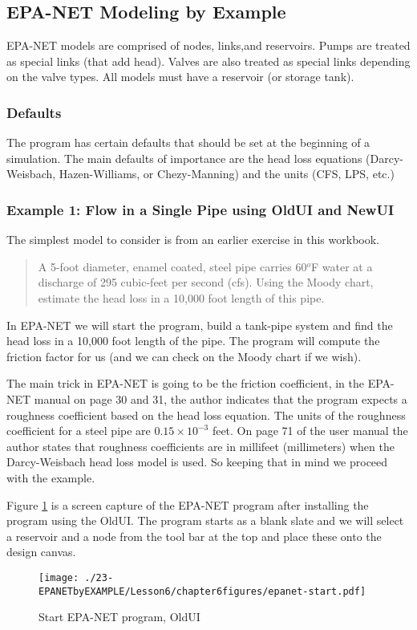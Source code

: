 \clearpage


\subsection{EPA-NET Modeling by Example}
EPA-NET models are comprised of nodes, links,and reservoirs.    
Pumps are treated as special links (that add head).  
Valves are also treated as special links depending on the valve types.  
All models must have a reservoir (or storage tank).

\subsubsection{Defaults}
The program has certain defaults that should be set at the beginning of a simulation.  
The main defaults of importance are the head loss equations (Darcy-Weisbach, Hazen-Williams, or Chezy-Manning) and the units (CFS, LPS, etc.)   

\subsubsection{Example 1: Flow in a Single Pipe using OldUI and NewUI}
The simplest model to consider is from an earlier exercise in this workbook.

\begin{quote}A 5-foot diameter, enamel coated, steel pipe carries 60$^o$F water at a discharge of 295 cubic-feet per second (cfs).  Using the Moody chart, estimate the head loss in a 10,000 foot length of this pipe.
\end{quote}

In EPA-NET we will start the program, build a tank-pipe system and find the head loss in a 10,000 foot length of the pipe.  The program will compute the friction factor for us (and we can check on the Moody chart if we wish).  

The main trick in EPA-NET is going to be the friction coefficient, in the EPA-NET manual on page 30 and 31, the author indicates that the program expects a roughness coefficient based on the head loss equation.  The units of the roughness coefficient for a steel pipe are $0.15 \times 10^{-3}$ feet.   On page 71 of the user manual the author states that roughness coefficients are in millifeet (millimeters) when the Darcy-Weisbach head loss model is used.   So keeping that in mind we proceed with the example.

Figure \ref{fig:epanet-start} is a screen capture of the EPA-NET program after installing the program using the OldUI.   The program starts as a blank slate and we will select a reservoir and a node from the tool bar at the top and place these onto the design canvas.
\begin{figure}[h!] %
   \centering
   \texttt{[image: ./23-EPANETbyEXAMPLE/Lesson6/chapter6figures/epanet-start.pdf]} 
   \caption{Start EPA-NET program, OldUI}
   \label{fig:epanet-start}
\end{figure}

